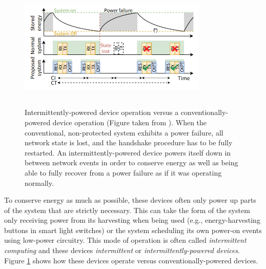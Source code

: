 \begin{figure}[]
    \centering
    \includegraphics[width=0.8\textwidth,height=6cm,keepaspectratio=true]{images/intermittent_device_operation.png}
    \caption{
       Intermittently-powered device operation versus a conventionally-powered device operation (Figure taken from \cite{freebie}). When the conventional, non-protected system exhibits a power failure, all network state is lost, and the handshake procedure has to be fully restarted. An intermittently-powered device powers itself down in between network events in order to conserve energy as well as being able to fully recover from a power failure as if it was operating normally.
    }
    \label{fig:intermittent_operation}
\end{figure}

To conserve energy as much as possible, these devices often only power up parts of the system that are strictly necessary. This can take the form of the system only receiving power from its harvesting when being used (e.g., energy-harvesting buttons in smart light switches) or the system scheduling its own power-on events using low-power circuitry. This mode of operation is often called \textit{intermittent computing} and these devices \textit{intermittent} or \textit{intermittently-powered devices}. Figure \ref{fig:intermittent_operation} shows how these devices operate versus conventionally-powered devices.

